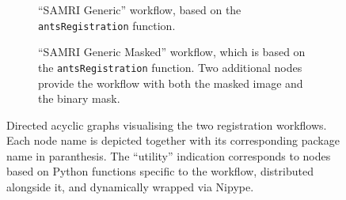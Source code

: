 \begin{figure}[h!]
	\begin{subfigure}{0.65\textwidth}
		\centering
		\vspace{1.4em}
		\caption{
			“SAMRI Generic” workflow, based on the \textcolor{mg}{\texttt{antsRegistration}} function.
		}
		\label{fig:nwfgg}
	\end{subfigure}
		\begin{subfigure}{0.65\textwidth}
		\centering
		\vspace{-1.9em}
		\caption{
			“SAMRI Generic Masked” workflow, which is based on the \textcolor{mg}{\texttt{antsRegistration}} function. Two additional nodes provide the workflow with both the masked image and the binary mask.
			}
		\label{fig:nwfgl}
	\end{subfigure}\hfill
	\caption{
		Directed acyclic graphs visualising the two registration workflows.
		Each node name is depicted together with its corresponding package name in paranthesis.
		The “utility” indication corresponds to nodes based on Python functions specific to the workflow, distributed alongside it, and dynamically wrapped via Nipype.
		}
	\label{fig:nwfg}
\end{figure}



